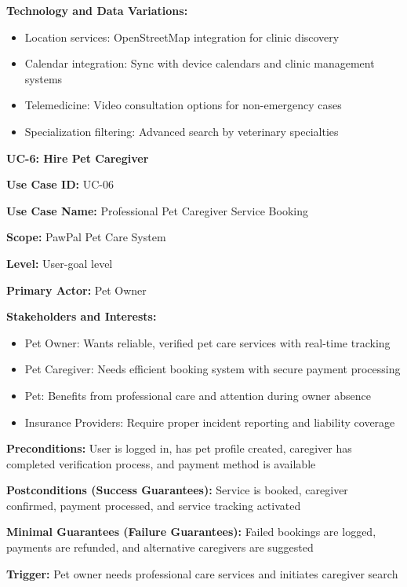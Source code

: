 \textbf{Technology and Data Variations:}
\begin{itemize}
    \item Location services: OpenStreetMap integration for clinic discovery
    \item Calendar integration: Sync with device calendars and clinic management systems
    \item Telemedicine: Video consultation options for non-emergency cases
    \item Specialization filtering: Advanced search by veterinary specialties
\end{itemize}

\textbf{UC-6: Hire Pet Caregiver}

\textbf{Use Case ID:} UC-06

\textbf{Use Case Name:} Professional Pet Caregiver Service Booking

\textbf{Scope:} PawPal Pet Care System

\textbf{Level:} User-goal level

\textbf{Primary Actor:} Pet Owner

\textbf{Stakeholders and Interests:}
\begin{itemize}
    \item Pet Owner: Wants reliable, verified pet care services with real-time tracking
    \item Pet Caregiver: Needs efficient booking system with secure payment processing
    \item Pet: Benefits from professional care and attention during owner absence
    \item Insurance Providers: Require proper incident reporting and liability coverage
\end{itemize}

\textbf{Preconditions:} User is logged in, has pet profile created, caregiver has completed verification process, and payment method is available

\textbf{Postconditions (Success Guarantees):} Service is booked, caregiver confirmed, payment processed, and service tracking activated

\textbf{Minimal Guarantees (Failure Guarantees):} Failed bookings are logged, payments are refunded, and alternative caregivers are suggested

\textbf{Trigger:} Pet owner needs professional care services and initiates caregiver search

